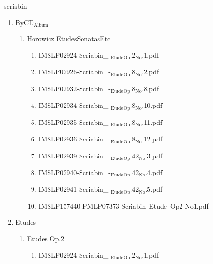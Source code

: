 \documentclass[11pt]{article}
\begin{document}
\item scriabin
\label{sec-1-1-1-1-44-63}
\begin{enumerate}
\item ByCD$_{\text{Album}}$
\label{sec-1-1-1-1-44-63-1}
\begin{enumerate}
\item Horowicz EtudesSonatasEtc
\label{sec-1-1-1-1-44-63-1-1}
\begin{enumerate}
\item IMSLP02924-Scriabin\_-$_{\text{Etude}}$$_{\text{Op}}$.2$_{\text{No}}$.1.pdf
\label{sec-1-1-1-1-44-63-1-1-1}

\item IMSLP02926-Scriabin\_-$_{\text{Etude}}$$_{\text{Op}}$.8$_{\text{No}}$.2.pdf
\label{sec-1-1-1-1-44-63-1-1-2}

\item IMSLP02932-Scriabin\_-$_{\text{Etude}}$$_{\text{Op}}$.8$_{\text{No}}$.8.pdf
\label{sec-1-1-1-1-44-63-1-1-3}

\item IMSLP02934-Scriabin\_-$_{\text{Etude}}$$_{\text{Op}}$.8$_{\text{No}}$.10.pdf
\label{sec-1-1-1-1-44-63-1-1-4}

\item IMSLP02935-Scriabin\_-$_{\text{Etude}}$$_{\text{Op}}$.8$_{\text{No}}$.11.pdf
\label{sec-1-1-1-1-44-63-1-1-5}

\item IMSLP02936-Scriabin\_-$_{\text{Etude}}$$_{\text{Op}}$.8$_{\text{No}}$.12.pdf
\label{sec-1-1-1-1-44-63-1-1-6}

\item IMSLP02939-Scriabin\_-$_{\text{Etude}}$$_{\text{Op}}$.42$_{\text{No}}$.3.pdf
\label{sec-1-1-1-1-44-63-1-1-7}

\item IMSLP02940-Scriabin\_-$_{\text{Etude}}$$_{\text{Op}}$.42$_{\text{No}}$.4.pdf
\label{sec-1-1-1-1-44-63-1-1-8}

\item IMSLP02941-Scriabin\_-$_{\text{Etude}}$$_{\text{Op}}$.42$_{\text{No}}$.5.pdf
\label{sec-1-1-1-1-44-63-1-1-9}

\item IMSLP157440-PMLP07373-Scriabin--Etude--Op2-No1.pdf
\label{sec-1-1-1-1-44-63-1-1-10}
\end{enumerate}
\end{enumerate}

\item Etudes
\label{sec-1-1-1-1-44-63-2}
\begin{enumerate}
\item Etudes Op.2
\label{sec-1-1-1-1-44-63-2-1}
\begin{enumerate}
\item IMSLP02924-Scriabin\_-$_{\text{Etude}}$$_{\text{Op}}$.2$_{\text{No}}$.1.pdf
\label{sec-1-1-1-1-44-63-2-1-1}


\end{enumerate}
\end{enumerate}
\end{enumerate}
\end{document}
